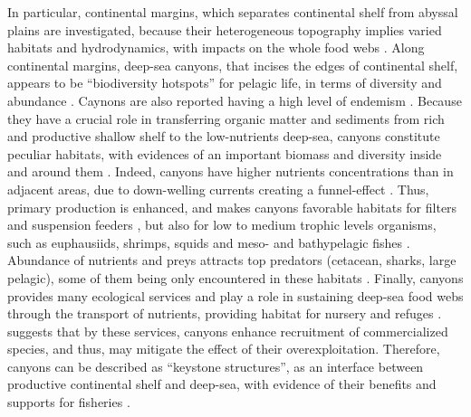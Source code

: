 In particular, continental margins, which separates continental shelf from abyssal plains are investigated, because their heterogeneous topography implies varied habitats and hydrodynamics, with impacts on the whole food webs \citep{danovaro2009,fernandez-arcaya2017}. Along continental margins, deep-sea canyons, that incises the edges of continental shelf, appears to be ``biodiversity hotspots'' for pelagic life, in terms of diversity and abundance \citep{aissi2012,danovaro2009,gillet2013,robertson2020}. Caynons are also reported having a high level of endemism \citep{danovaro2009,danovaro2017}. Because they have a crucial role in transferring organic matter and sediments from rich and productive shallow shelf to the low-nutrients deep-sea, canyons constitute peculiar habitats, with evidences of an important biomass and diversity inside and around them \citep{canals2006,danovaro2009,deleo2012,sion2019,stefanescu1994}. Indeed, canyons have higher nutrients concentrations than in adjacent areas, due to down-welling currents creating a funnel-effect \citep{fernandez-arcaya2017}. Thus, primary production is enhanced, and makes canyons favorable habitats for filters and suspension feeders \citep{fernandez-arcaya2017,sion2019}, but also for low to medium trophic levels organisms, such as euphausiids, shrimps, squids and meso- and bathypelagic fishes \citep{aissi2012,gaskett2001,pusch2004}. Abundance of nutrients and preys attracts top predators (cetacean, sharks, large pelagic), some of them being only encountered in these habitats \citep{aissi2012}. Finally, canyons provides many ecological services and play a role in sustaining deep-sea food webs through the transport of nutrients, providing habitat for nursery and refuges \citep{fernandez-arcaya2017}. \citet{company2008} suggests that by these services, canyons enhance recruitment of commercialized species, and thus, may mitigate the effect of their overexploitation. Therefore, canyons can be described as ``keystone structures'', as an interface between productive continental shelf and deep-sea, with evidence of their benefits and supports for fisheries \citep{company2012,fernandez-arcaya2017}.

